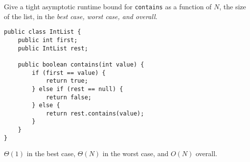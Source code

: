 \begin{blocksection}
\question Give a tight asymptotic runtime bound for \lstinline$contains$ as a
function of $N$, the size of the list, in the \emph{best case, worst case, and
overall}.

\begin{lstlisting}
public class IntList {
    public int first;
    public IntList rest;

    public boolean contains(int value) {
        if (first == value) {
            return true;
        } else if (rest == null) {
            return false;
        } else {
            return rest.contains(value);
        }
    }
}
\end{lstlisting}

\begin{solution}[0.5in]
$\Theta(1)$ in the best case, $\Theta(N)$ in the worst case, and $O(N)$ overall.
\end{solution}
\end{blocksection}
